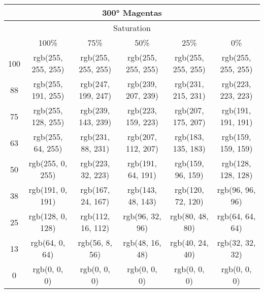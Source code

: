 \documentclass[a4j]{jarticle}
\begin{document}
\begin{tabular}{|c|c|c|c|c|c|}
\multicolumn{6}{|c|}{300°
 Magentas}\\\hline\multicolumn{6}{|c|}{Saturation}\\\hline&100\%&75\%&50\%&25\%&0\%\\\hline100&rgb(255,
     255, 255)&rgb(255, 255, 255)&rgb(255, 255, 255)&rgb(255, 255,
                 255)&rgb(255, 255, 255)\\\hline88&rgb(255, 191,
     255)&rgb(247, 199, 247)&rgb(239, 207, 239)&rgb(231, 215,
                 231)&rgb(223, 223, 223)\\\hline75&rgb(255, 128,
     255)&rgb(239, 143, 239)&rgb(223, 159, 223)&rgb(207, 175,
                 207)&rgb(191, 191, 191)\\\hline63&rgb(255, 64,
     255)&rgb(231, 88, 231)&rgb(207, 112, 207)&rgb(183, 135,
                 183)&rgb(159, 159, 159)\\\hline50&rgb(255, 0,
     255)&rgb(223, 32, 223)&rgb(191, 64, 191)&rgb(159, 96, 159)&rgb(128,
                     128, 128)\\\hline38&rgb(191, 0, 191)&rgb(167, 24,
         167)&rgb(143, 48, 143)&rgb(120, 72, 120)&rgb(96, 96,
                     96)\\\hline25&rgb(128, 0, 128)&rgb(112, 16,
         112)&rgb(96, 32, 96)&rgb(80, 48, 80)&rgb(64, 64,
                     64)\\\hline13&rgb(64, 0, 64)&rgb(56, 8, 56)&rgb(48,
             16, 48)&rgb(40, 24, 40)&rgb(32, 32, 32)\\\hline0&rgb(0, 0,
     0)&rgb(0, 0, 0)&rgb(0, 0, 0)&rgb(0, 0, 0)&rgb(0, 0, 0) 
\end{tabular}
\end{document}
